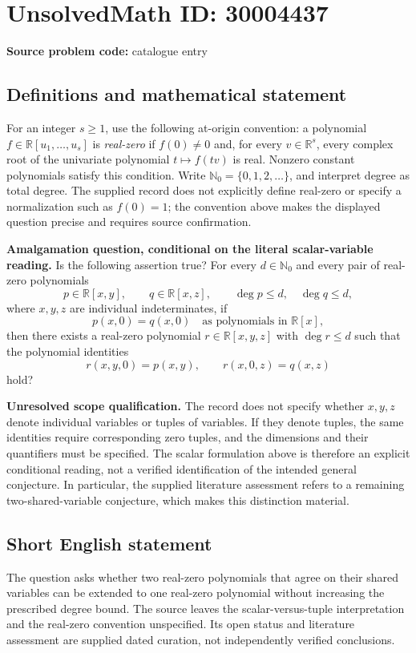 \documentclass[11pt]{article}
\newcommand{\N}{\mathbb{N}}
\newcommand{\R}{\mathbb{R}}
\begin{document}
\section*{UnsolvedMath ID: 30004437}
\textbf{Source problem code:} catalogue entry
\subsection{Definitions and mathematical statement}
For an integer \(s\geq 1\), use the following at-origin convention: a polynomial \(f\in\R[u_1,\ldots,u_s]\) is \emph{real-zero} if \(f(0)\ne 0\) and, for every \(v\in\R^s\), every complex root of the univariate polynomial \(t\mapsto f(tv)\) is real. Nonzero constant polynomials satisfy this condition. Write \(\N_0=\{0,1,2,\ldots\}\), and interpret degree as total degree. The supplied record does not explicitly define real-zero or specify a normalization such as \(f(0)=1\); the convention above makes the displayed question precise and requires source confirmation.

\textbf{Amalgamation question, conditional on the literal scalar-variable reading.} Is the following assertion true? For every \(d\in\N_0\) and every pair of real-zero polynomials
\[
p\in\R[x,y],\qquad q\in\R[x,z],\qquad \deg p\leq d,\quad \deg q\leq d,
\]
where \(x,y,z\) are individual indeterminates, if
\[
p(x,0)=q(x,0)\quad\text{as polynomials in }\R[x],
\]
then there exists a real-zero polynomial \(r\in\R[x,y,z]\) with \(\deg r\leq d\) such that the polynomial identities
\[
r(x,y,0)=p(x,y),\qquad r(x,0,z)=q(x,z)
\]
hold?

\textbf{Unresolved scope qualification.} The record does not specify whether \(x,y,z\) denote individual variables or tuples of variables. If they denote tuples, the same identities require corresponding zero tuples, and the dimensions and their quantifiers must be specified. The scalar formulation above is therefore an explicit conditional reading, not a verified identification of the intended general conjecture. In particular, the supplied literature assessment refers to a remaining two-shared-variable conjecture, which makes this distinction material.
\subsection{Short English statement}
The question asks whether two real-zero polynomials that agree on their shared variables can be extended to one real-zero polynomial without increasing the prescribed degree bound. The source leaves the scalar-versus-tuple interpretation and the real-zero convention unspecified. Its open status and literature assessment are supplied dated curation, not independently verified conclusions.
\end{document}
